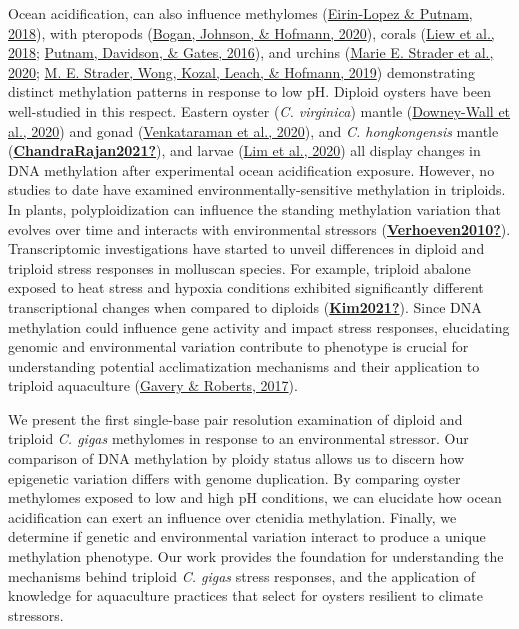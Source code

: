 \documentclass [11pt, proquest] {uwthesis}[2015/03/03]
\begin{document}
Ocean acidification, can also influence methylomes (\protect\hyperlink{ref-Eirin-Lopez2018}{Eirin-Lopez \& Putnam, 2018}), with pteropods (\protect\hyperlink{ref-Bogan2020}{Bogan, Johnson, \& Hofmann, 2020}), corals (\protect\hyperlink{ref-Liew2018}{Liew et al., 2018}; \protect\hyperlink{ref-Putnam2016}{Putnam, Davidson, \& Gates, 2016}), and urchins (\protect\hyperlink{ref-Strader2020}{Marie E. Strader et al., 2020}; \protect\hyperlink{ref-Strader2019}{M. E. Strader, Wong, Kozal, Leach, \& Hofmann, 2019}) demonstrating distinct methylation patterns in response to low pH. Diploid oysters have been well-studied in this respect. Eastern oyster (\emph{C. virginica}) mantle (\protect\hyperlink{ref-Downey-Wall2020}{Downey-Wall et al., 2020}) and gonad (\protect\hyperlink{ref-Venkataraman2020}{Venkataraman et al., 2020}), and \emph{C. hongkongensis} mantle (\protect\hyperlink{ref-ChandraRajan2021}{\textbf{ChandraRajan2021?}}), and larvae (\protect\hyperlink{ref-Lim2020}{Lim et al., 2020}) all display changes in DNA methylation after experimental ocean acidification exposure. However, no studies to date have examined environmentally-sensitive methylation in triploids. In plants, polyploidization can influence the standing methylation variation that evolves over time and interacts with environmental stressors (\protect\hyperlink{ref-Verhoeven2010}{\textbf{Verhoeven2010?}}). Transcriptomic investigations have started to unveil differences in diploid and triploid stress responses in molluscan species. For example, triploid abalone exposed to heat stress and hypoxia conditions exhibited significantly different transcriptional changes when compared to diploids (\protect\hyperlink{ref-Kim2021}{\textbf{Kim2021?}}). Since DNA methylation could influence gene activity and impact stress responses, elucidating genomic and environmental variation contribute to phenotype is crucial for understanding potential acclimatization mechanisms and their application to triploid aquaculture (\protect\hyperlink{ref-Gavery2017}{Gavery \& Roberts, 2017}).

We present the first single-base pair resolution examination of diploid and triploid \emph{C. gigas} methylomes in response to an environmental stressor. Our comparison of DNA methylation by ploidy status allows us to discern how epigenetic variation differs with genome duplication. By comparing oyster methylomes exposed to low and high pH conditions, we can elucidate how ocean acidification can exert an influence over ctenidia methylation. Finally, we determine if genetic and environmental variation interact to produce a unique methylation phenotype. Our work provides the foundation for understanding the mechanisms behind triploid \emph{C. gigas} stress responses, and the application of knowledge for aquaculture practices that select for oysters resilient to climate stressors.
\end{document}
